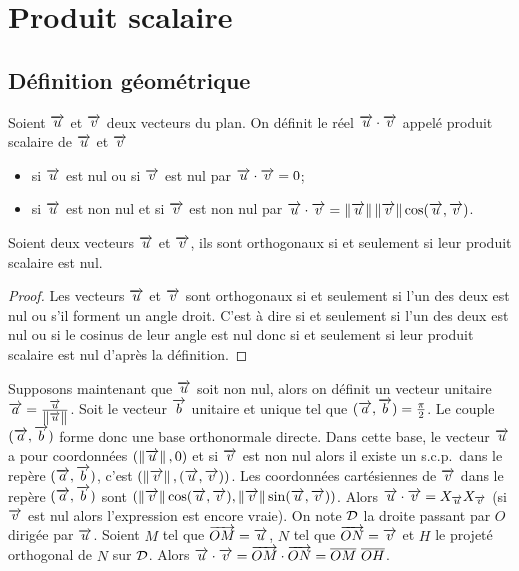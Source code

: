 \section{Produit scalaire}
\label{sec:prodscalaire}
\subsection{Définition géométrique}
\begin{defdef}
  Soient \(\vu\) et \(\vv\) deux vecteurs du plan. On définit le réel \(\vu \cdot \vv\) appelé produit scalaire de \(\vu\) et \(\vv\) 
  \begin{itemize}
  \item si \(\vu\) est nul ou si \(\vv\) est nul par \(\vu \cdot \vv=0\);
  \item si \(\vu\) est non nul et si \(\vv\) est non nul par \(\vu \cdot \vv=\norme{\vu}\norme{\vv}\cos(\vu, \vv)\).
  \end{itemize}
\end{defdef}
\begin{prop}
   Soient deux vecteurs \(\vu\) et \(\vv\), ils sont orthogonaux si et seulement si leur produit scalaire est nul.
\end{prop}
\begin{proof}
Les vecteurs \(\vu\) et \(\vv\) sont orthogonaux si et seulement si l'un des deux est nul ou s'il forment un angle droit. C'est à dire si et seulement si l'un des deux est nul ou si le cosinus de leur angle est nul donc si et seulement si leur produit scalaire est nul d'après la définition.
\end{proof}

Supposons maintenant que \(\vu\) soit non nul, alors on définit un vecteur unitaire \(\vect{a}=\frac{\vu}{\norme{\vu}}\). Soit le vecteur \(\vect{b}\) unitaire et unique tel que \((\vect{a},\vect{b})=\frac{\pi}{2}\). Le couple \((\vect{a},\vect{b})\) forme donc une base orthonormale directe. Dans cette base, le vecteur \(\vu\) a pour coordonnées \((\norme{\vu},0)\) et si \(\vv\) est non nul alors il existe un s.c.p.\ dans le repère \((\vect{a},\vect{b})\), c'est \((\norme{\vv}, (\vu,\vv))\). Les coordonnées cartésiennes de \(\vv\) dans le repère \((\vect{a},\vect{b})\) sont \((\norme{\vv}\cos(\vu,\vv),\norme{\vv}\sin(\vu,\vv))\). Alors \(\vu \cdot \vv=X_{\vu}X_{\vv}\) (si \(\vv\) est nul alors l'expression est encore vraie). On note \(\Dr\) la droite passant par \(O\) dirigée par \(\vu\). Soient \(M\) tel que \(\vect{OM}=\vu\), \(N\) tel que \(\vect{ON}=\vv\) et \(H\) le projeté orthogonal de \(N\) sur \(\Dr\). Alors \(\vu \cdot \vv=\vect{OM} \cdot \vect{ON}= \overline{OM}~\overline{OH}\).

